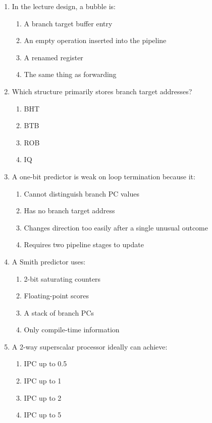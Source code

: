 \documentclass[11pt]{article}
\begin{document}
\begin{enumerate}[label=\textbf{A\arabic*.}]
  \item In the lecture design, a bubble is:
  \begin{enumerate}[label=(\Alph*)]
    \item A branch target buffer entry
    \item An empty operation inserted into the pipeline
    \item A renamed register
    \item The same thing as forwarding
  \end{enumerate}

  \item Which structure primarily stores branch target addresses?
  \begin{enumerate}[label=(\Alph*)]
    \item BHT
    \item BTB
    \item ROB
    \item IQ
  \end{enumerate}

  \item A one-bit predictor is weak on loop termination because it:
  \begin{enumerate}[label=(\Alph*)]
    \item Cannot distinguish branch PC values
    \item Has no branch target address
    \item Changes direction too easily after a single unusual outcome
    \item Requires two pipeline stages to update
  \end{enumerate}

  \item A Smith predictor uses:
  \begin{enumerate}[label=(\Alph*)]
    \item 2-bit saturating counters
    \item Floating-point scores
    \item A stack of branch PCs
    \item Only compile-time information
  \end{enumerate}

  \item A 2-way superscalar processor ideally can achieve:
  \begin{enumerate}[label=(\Alph*)]
    \item IPC up to 0.5
    \item IPC up to 1
    \item IPC up to 2
    \item IPC up to 5
  \end{enumerate}
\end{enumerate}
\end{document}
